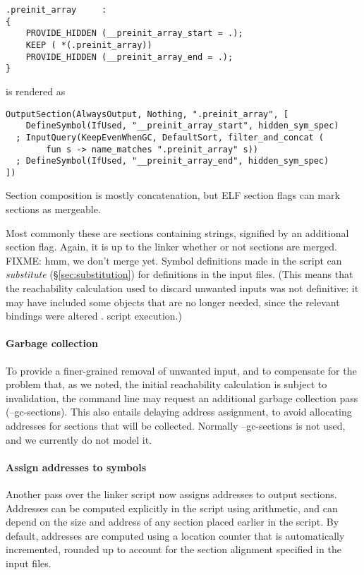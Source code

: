 \begin{lstlisting}[basicstyle=\scriptsize\sffamily,language=plain]
.preinit_array     :
{
    PROVIDE_HIDDEN (__preinit_array_start = .);
    KEEP ( *(.preinit_array))
    PROVIDE_HIDDEN (__preinit_array_end = .);
}
\end{lstlisting}
  
is rendered as 

\begin{lstlisting}[basicstyle=\scriptsize\sffamily,language=plain]
OutputSection(AlwaysOutput, Nothing, ".preinit_array", [
    DefineSymbol(IfUsed, "__preinit_array_start", hidden_sym_spec)
  ; InputQuery(KeepEvenWhenGC, DefaultSort, filter_and_concat (
        fun s -> name_matches ".preinit_array" s))
  ; DefineSymbol(IfUsed, "__preinit_array_end", hidden_sym_spec)
])
\end{lstlisting}

Section composition is mostly concatenation, but ELF section flags can mark sections as mergeable.

Most commonly these are sections containing strings, signified by an additional section flag.
Again, it is up to the linker whether or not sections are merged.
FIXME: hmm, we don't merge yet.
Symbol definitions made in the script can \emph{substitute} (\S\ref{sec:substitution}) for definitions 
in the input files. (This means that the reachability calculation
used to discard unwanted inputs was not definitive: it may have included
some objects that are no longer needed, since the relevant bindings were altered .
script execution.)

\paragraph{Garbage collection} To provide a finer-grained 
removal of unwanted input, and to compensate for the problem that, as we noted,
the initial reachability calculation is subject to invalidation, 
the command line may request an additional garbage collection pass (\textsf{--gc-sections}).
This also entails delaying address assignment, to avoid allocating addresses for sections
that will be collected.
Normally \textsf{--gc-sections} is not used, and we currently do not model it.

\paragraph{Assign addresses to symbols} Another pass over the linker script now
assigns addresses to output sections. 
Addresses can be computed explicitly in the script using arithmetic, and can depend on the size
and address of any section placed earlier in the script. 
By default, addresses are computed using a location counter
that is automatically incremented, rounded up to account for the section alignment specified in the input files.

